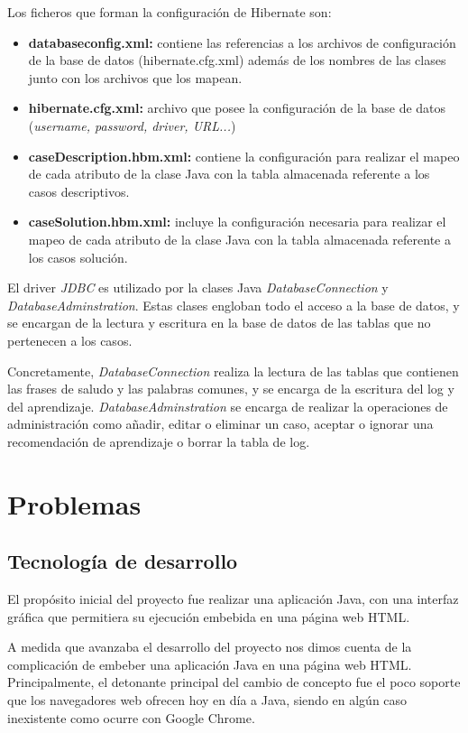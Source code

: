 Los ficheros que forman la configuración de Hibernate son:

\begin{itemize}
\tightlist
\item
\textbf{databaseconfig.xml:} contiene las referencias a los archivos de configuración de la base de datos (hibernate.cfg.xml) además de los nombres de las clases junto con los archivos que los mapean.
\item
\textbf{hibernate.cfg.xml:} archivo que posee la configuración de la base de datos (\emph{username, password, driver, URL...})
\item
\textbf{caseDescription.hbm.xml:} contiene la configuración para realizar el mapeo de cada atributo de la clase Java con la tabla almacenada referente a los casos descriptivos.
\item
\textbf{caseSolution.hbm.xml:} incluye la configuración necesaria para realizar el mapeo de cada atributo de la clase Java con la tabla almacenada referente a los casos solución.
\end{itemize}

El driver \emph{JDBC} es utilizado por la clases Java \emph{DatabaseConnection} y \emph{DatabaseAdminstration}. Estas clases engloban todo el acceso a la base de datos, y se encargan de la lectura y escritura en la base de datos de las tablas que no pertenecen a los casos.

Concretamente, \emph{DatabaseConnection} realiza la lectura de las tablas que contienen las frases de saludo y las palabras comunes, y se encarga de la escritura del log y del aprendizaje. \emph{DatabaseAdminstration} se encarga de realizar la operaciones de administración como añadir, editar o eliminar un caso, aceptar o ignorar una recomendación de aprendizaje o borrar la tabla de log.


\section{Problemas}\label{problemas}

\subsection{Tecnología de desarrollo}

El propósito inicial del proyecto fue realizar una aplicación Java, con una interfaz gráfica que permitiera su ejecución embebida en una página web HTML.

A medida que avanzaba el desarrollo del proyecto nos dimos cuenta de la complicación de embeber una aplicación Java en una página web HTML. Principalmente, el detonante principal del cambio de concepto fue el poco soporte que los navegadores web ofrecen hoy en día a Java, siendo en algún caso inexistente como ocurre con Google Chrome.

